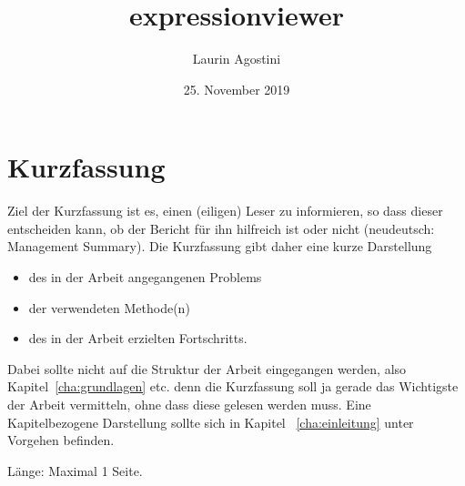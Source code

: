 \documentclass[oneside]{ausarbeitung}
\begin{document}



\title{expressionviewer}

\author{Laurin Agostini}

\date{25. November 2019}

\maketitle
\cleardoublepage

\setcounter{page}{1}


\makeaffirmation
\cleardoublepage

\chapter*{Kurzfassung}

Ziel der Kurzfassung ist es, einen (eiligen) Leser zu informieren, so 
dass dieser entscheiden kann, ob der Bericht für ihn hilfreich ist oder 
nicht (neudeutsch: Management Summary). Die Kurzfassung gibt daher eine 
kurze Darstellung

\begin{itemize}
  \item des in der Arbeit angegangenen Problems
  \item der verwendeten Methode(n)
  \item des in der Arbeit erzielten Fortschritts.
\end{itemize}

Dabei sollte nicht auf die Struktur der Arbeit eingegangen werden, also 
Kapitel~\ref{cha:grundlagen} etc. denn die Kurzfassung soll ja gerade 
das Wichtigste der Arbeit vermitteln, ohne dass diese gelesen werden muss. Eine Kapitelbezogene Darstellung sollte sich in Kapitel~%
\ref{cha:einleitung} unter Vorgehen befinden.

Länge: Maximal 1 Seite.

\cleardoublepage
{}
\tableofcontents
\end{document}
